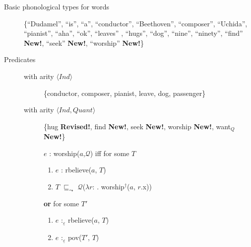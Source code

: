 \begin{description}

  
\item[Basic phonological  types for words] \mbox{}

  \{``Dudamel'', ``is'', ``a'', ``conductor'', ``Beethoven'',
  ``composer'', ``Uchida'', ``pianist'', ``aha'', ``ok'', ``leaves''
  , ``hugs'', ``dog'', ``nine'',
  ``ninety'', ``find'' \textbf{New!}, ``seek'' \textbf{New!},
  ``worship'' \textbf{New!}\}



  
\item[Predicates] \mbox{}
  
  \begin{description}
  
  \item[with arity \textnormal{$\langle\textit{Ind}\rangle$}]
    \{conductor, composer, pianist, leave,  dog,
    passenger\}
    
  \item[with arity
    \textnormal{$\langle\textit{Ind},\textit{Quant}\rangle$}] \{hug
    \textbf{Revised!}, find \textbf{New!}, seek \textbf{New!}, worship
    \textbf{New!}, want$_Q$ \textbf{New!}\}

      $e$ : worship($a$,$\mathcal{Q}$) iff for some $T$
\begin{enumerate} 
 
\item $e$ : rbelieve($a$, $T$) 
 
\item $T$ $\sqsubseteq_{\leadsto}$ $\mathcal{Q}$($\lambda
  r$:
  . worship$^\dagger$($a$, $r$.x))
 
\end{enumerate}
\textbf{or} for some $T'$
\begin{enumerate} 
 
\item $e$ :$_{\underline{\varepsilon}}$ rbelieve($a$, $T$)

\item $e$ :$_{\underline{\varepsilon}}$ pov($T'$, $T$)
 

\end{enumerate}
\end{description}
\end{description}
